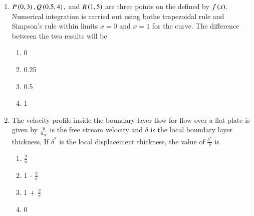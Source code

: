 \documentclass[journal,12pt,onecolumn]{IEEEtran}
\theoremstyle{remark}
\begin{document}
\begin{enumerate}
        \hfill{}
        \begin{multicols}{4}
            \begin{enumerate}
                \item $\frac{\pi}{2}$
                    \columnbreak
                \item $\pi$
                    \columnbreak
                \item $2\pi$
                    \columnbreak
                \item $4\pi$
            \end{enumerate}
        \end{multicols}
    \item $P\left(0, 3\right), Q\left(0.5, 4\right),$ and $R\left(1, 5\right)$ are three points on the defined by $f\left(x\right)$.
        Numerical integration is carried out using bothe trapezoidal rule and Simpson's rule within limits
        $x = 0$ and $x = 1$ for the curve. The difference between the two results will be
        \hfill{}
        \begin{multicols}{4}
            \begin{enumerate}
                \item 0
                    \columnbreak
                \item 0.25
                    \columnbreak
                \item 0.5
                    \columnbreak
                \item 1
            \end{enumerate}
        \end{multicols}
    \item The velocity profile inside the boundary layer flow for flow over a flat plate is given by 
        $\frac{u}{u_{\infty}}$ is the free stream velocity and $\delta$ is the local boundary layer
        thickness, If $\delta ^*$ is the local displacement thickness, the value of $\frac{\delta ^ *}{\delta}$ is
        \hfill{}
        \begin{multicols}{4}
            \begin{enumerate}
                \item $\frac{2}{\pi}$
                    \columnbreak
                \item 1 - $\frac{2}{\pi}$
                    \columnbreak
                \item 1 + $\frac{2}{\pi}$
                    \columnbreak
                \item 0

\end{enumerate}
\end{multicols}
\end{enumerate}
\end{document}
